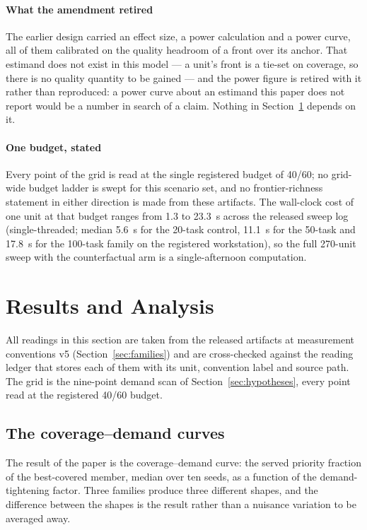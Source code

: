 \documentclass[preprint,authoryear]{elsarticle}
\begin{document}
\paragraph{What the amendment retired} The earlier design carried an effect size, a power calculation and a power curve, all of them calibrated on the quality headroom of a front over its anchor. That estimand does not exist in this model --- a unit's front is a tie-set on coverage, so there is no quality quantity to be gained --- and the power figure is retired with it rather than reproduced: a power curve about an estimand this paper does not report would be a number in search of a claim. Nothing in Section~\ref{sec:results} depends on it.

\paragraph{One budget, stated} Every point of the grid is read at the single registered budget of 40/60; no grid-wide budget ladder is swept for this scenario set, and no frontier-richness statement in either direction is made from these artifacts. The wall-clock cost of one unit at that budget ranges from 1.3 to 23.3~s across the released sweep log (single-threaded; median 5.6~s for the 20-task control, 11.1~s for the 50-task and 17.8~s for the 100-task family on the registered workstation), so the full 270-unit sweep with the counterfactual arm is a single-afternoon computation.

\section{Results and Analysis}\label{sec:results}

All readings in this section are taken from the released artifacts at measurement conventions v5 (Section~\ref{sec:families}) and are cross-checked against the reading ledger that stores each of them with its unit, convention label and source path. The grid is the nine-point demand scan of Section~\ref{sec:hypotheses}, every point read at the registered 40/60 budget.

\subsection{The coverage--demand curves}\label{sec:curve}

The result of the paper is the coverage--demand curve: the served priority fraction of the best-covered member, median over ten seeds, as a function of the demand-tightening factor. Three families produce three different shapes, and the difference between the shapes is the result rather than a nuisance variation to be averaged away.
\end{document}
